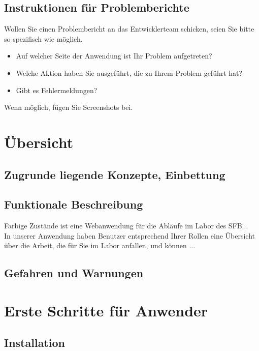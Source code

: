 \documentclass[enabledeprecatedfontcommands,fontsize=12pt,paper=a4,twoside]{scrartcl}
\begin{document}
\subsection{Instruktionen für Problemberichte}
Wollen Sie einen Problembericht an das Entwicklerteam schicken, seien Sie bitte so spezifisch wie möglich. 
\begin{itemize}
\item Auf welcher Seite der Anwendung ist Ihr Problem aufgetreten?
\item Welche Aktion haben Sie ausgeführt, die zu Ihrem Problem geführt hat?
\item Gibt es Fehlermeldungen? 
\end{itemize}
Wenn möglich, fügen Sie Screenshots bei. \\


\newpage
\section{Übersicht}
\subsection{Zugrunde liegende Konzepte, Einbettung}
\subsection{Funktionale Beschreibung}
Farbige Zustände ist eine Webanwendung für die Abläufe im Labor des SFB...\\
In unserer Anwendung haben Benutzer entsprechend Ihrer Rollen eine Übersicht über die Arbeit, die für Sie im Labor anfallen, und können ... \\
\subsection{Gefahren und Warnungen}


\clearpage
\section{Erste Schritte für Anwender}

\subsection{Installation}
\end{document}
